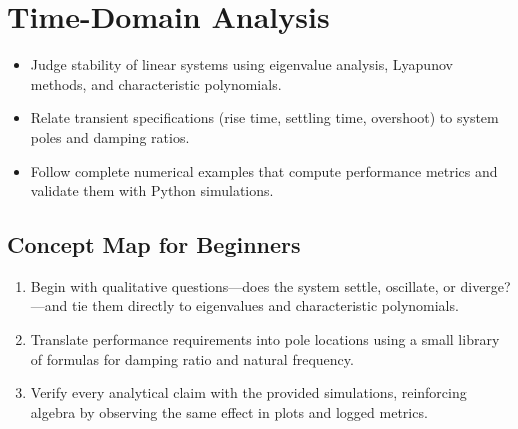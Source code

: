 \chapter{Time-Domain Analysis}
\label{chap:time}

\begin{learningobjective}
\begin{itemize}[leftmargin=*]
    \item Judge stability of linear systems using eigenvalue analysis, Lyapunov methods, and characteristic polynomials.
    \item Relate transient specifications (rise time, settling time, overshoot) to system poles and damping ratios.
    \item Follow complete numerical examples that compute performance metrics and validate them with Python simulations.
\end{itemize}
\end{learningobjective}

\section{Concept Map for Beginners}
\begin{conceptroadmap}
\begin{enumerate}[leftmargin=*]
    \item Begin with qualitative questions—does the system settle, oscillate, or diverge?—and tie them directly to eigenvalues and characteristic polynomials.
    \item Translate performance requirements into pole locations using a small library of formulas for damping ratio and natural frequency.
    \item Verify every analytical claim with the provided simulations, reinforcing algebra by observing the same effect in plots and logged metrics.
\end{enumerate}
\end{conceptroadmap}

